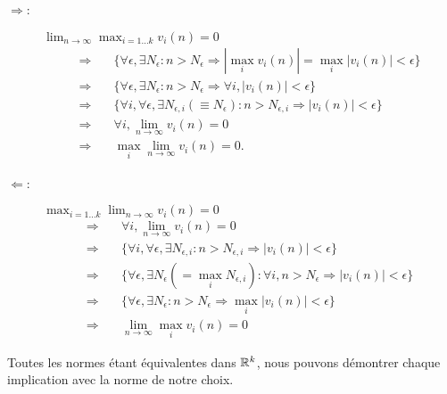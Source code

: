 \proof
\begin{description}
  \item[$\Rightarrow$:] $\lim_{n \to \infty} \max_{i=1 \dots k} v_i(n) = 0$
  \begin{align*}
    \Rightarrow \quad & \{\forall \epsilon, \exists N_\epsilon: n > N_\epsilon \Rightarrow |\max_i v_i(n)| = \max_i |v_i(n)| < \epsilon\} \\
    \Rightarrow \quad & \{\forall \epsilon, \exists N_\epsilon: n > N_\epsilon \Rightarrow \forall i, |v_i(n)| < \epsilon\} \\
    \Rightarrow \quad & \{\forall i, \forall \epsilon, \exists N_{\epsilon, i}(\equiv N_\epsilon): n > N_{\epsilon, i} \Rightarrow |v_i(n)| < \epsilon\} \\
    \Rightarrow \quad & \forall i, \lim_{n \to \infty} v_i(n) = 0 \\
    \Rightarrow \quad & \max_i \lim_{n \to \infty} v_i(n) = 0.
  \end{align*}
  \item[$\Leftarrow$:] $\max_{i=1 \dots k} \lim_{n \to \infty} v_i(n) = 0$
  \begin{align*}
    \Rightarrow \quad & \forall i, \lim_{n \to \infty} v_i(n) = 0 \\
    \Rightarrow \quad & \{\forall i, \forall \epsilon, \exists N_{\epsilon, i}: n > N_{\epsilon, i} \Rightarrow |v_i(n)| < \epsilon\}\\
    \Rightarrow \quad & \{\forall \epsilon, \exists N_\epsilon (= \max_i N_{\epsilon, i}): \forall i, n > N_\epsilon \Rightarrow |v_i(n)| < \epsilon\}\\
    \Rightarrow \quad & \{\forall \epsilon, \exists N_\epsilon: n > N_\epsilon \Rightarrow \max_i |v_i(n)| < \epsilon\}\\
    \Rightarrow \quad & \lim_{n \to \infty} \max_i v_i(n) = 0
  \end{align*}
\end{description}
\eproof

\proof
Toutes les normes étant équivalentes dans $\mathbb{R}^k$, nous pouvons démontrer chaque implication avec la norme de notre choix.


